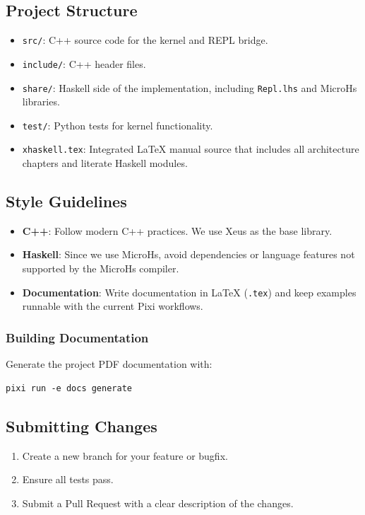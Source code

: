 \documentclass[11pt]{article}
\begin{document}
\subsection{Project Structure}


\begin{itemize}
\item \texttt{src/}: C++ source code for the kernel and REPL bridge.
\item \texttt{include/}: C++ header files.
\item \texttt{share/}: Haskell side of the implementation, including \texttt{Repl.lhs} and MicroHs libraries.
\item \texttt{test/}: Python tests for kernel functionality.
\item \texttt{xhaskell.tex}: Integrated LaTeX manual source that includes all architecture chapters and literate Haskell modules.
\end{itemize}


\subsection{Style Guidelines}


\begin{itemize}
\item \textbf{C++}: Follow modern C++ practices. We use Xeus as the base library.
\item \textbf{Haskell}: Since we use MicroHs, avoid dependencies or language features not supported by the MicroHs compiler.
\item \textbf{Documentation}: Write documentation in LaTeX (\texttt{.tex}) and keep examples runnable with the current Pixi workflows.
\end{itemize}

\subsubsection{Building Documentation}

Generate the project PDF documentation with:
\begin{verbatim}
pixi run -e docs generate
\end{verbatim}


\subsection{Submitting Changes}


\begin{enumerate}
\item Create a new branch for your feature or bugfix.
\item Ensure all tests pass.
\item Submit a Pull Request with a clear description of the changes.
\end{enumerate}
\end{document}
